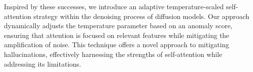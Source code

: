Inspired by these successes, we introduce an adaptive temperature-scaled self-attention strategy within the denoising process of diffusion models. 
Our approach dynamically adjusts the temperature parameter based on an anomaly score, ensuring that attention is focused on relevant features while mitigating the amplification of noise. 
This technique offers a novel approach to mitigating hallucinations, effectively harnessing the strengths of self-attention while addressing its limitations.